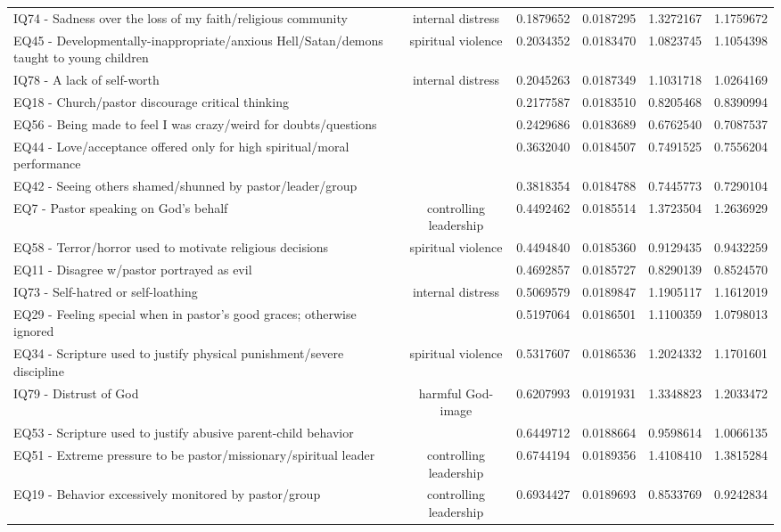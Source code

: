 \documentclass[
  letterpaper,
  DIV=11,
  numbers=noendperiod]{scrreport}
\begin{document}
\begin{longtable}[t]{>{\raggedright\arraybackslash}p{11cm}ccccc}
*IQ74 - Sadness over the loss of my faith/religious community & internal distress & 0.1879652 & 0.0187295 & 1.3272167 & 1.1759672\\
*EQ45 - Developmentally-inappropriate/anxious Hell/Satan/demons taught to young children & spiritual violence & 0.2034352 & 0.0183470 & 1.0823745 & 1.1054398\\
*IQ78 - A lack of self-worth & internal distress & 0.2045263 & 0.0187349 & 1.1031718 & 1.0264169\\
EQ18 - Church/pastor discourage critical thinking &  & 0.2177587 & 0.0183510 & 0.8205468 & 0.8390994\\
\addlinespace
EQ56 - Being made to feel I was crazy/weird for doubts/questions &  & 0.2429686 & 0.0183689 & 0.6762540 & 0.7087537\\
EQ44 - Love/acceptance offered only for high spiritual/moral performance &  & 0.3632040 & 0.0184507 & 0.7491525 & 0.7556204\\
EQ42 - Seeing others shamed/shunned by pastor/leader/group &  & 0.3818354 & 0.0184788 & 0.7445773 & 0.7290104\\
*EQ7 - Pastor speaking on God's behalf & controlling leadership & 0.4492462 & 0.0185514 & 1.3723504 & 1.2636929\\
*EQ58 - Terror/horror used to motivate religious decisions & spiritual violence & 0.4494840 & 0.0185360 & 0.9129435 & 0.9432259\\
\addlinespace
EQ11 - Disagree w/pastor portrayed as evil &  & 0.4692857 & 0.0185727 & 0.8290139 & 0.8524570\\
*IQ73 - Self-hatred or self-loathing & internal distress & 0.5069579 & 0.0189847 & 1.1905117 & 1.1612019\\
EQ29 - Feeling special when in pastor’s good graces; otherwise ignored &  & 0.5197064 & 0.0186501 & 1.1100359 & 1.0798013\\
*EQ34 - Scripture used to justify physical punishment/severe discipline & spiritual violence & 0.5317607 & 0.0186536 & 1.2024332 & 1.1701601\\
*IQ79 - Distrust of God & harmful God-image & 0.6207993 & 0.0191931 & 1.3348823 & 1.2033472\\
\addlinespace
EQ53 - Scripture used to justify abusive parent-child behavior &  & 0.6449712 & 0.0188664 & 0.9598614 & 1.0066135\\
*EQ51 - Extreme pressure to be pastor/missionary/spiritual leader & controlling leadership & 0.6744194 & 0.0189356 & 1.4108410 & 1.3815284\\
*EQ19 - Behavior excessively monitored by pastor/group & controlling leadership & 0.6934427 & 0.0189693 & 0.8533769 & 0.9242834\\

\end{longtable}
\end{document}

